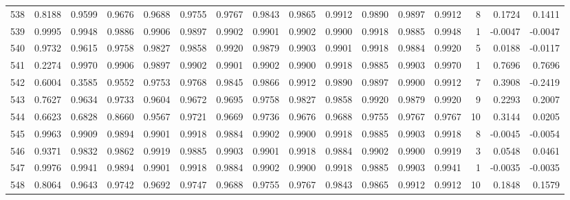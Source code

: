 \begin{tabular}{lrrrrrrrrrrrrrrr}
538 &      0.8188 &  0.9599 &  0.9676 &  0.9688 &  0.9755 &  0.9767 &  0.9843 &  0.9865 &  0.9912 &  0.9890 &   0.9897 &     0.9912 &      8 &                    0.1724 &                     0.1411 \\
539 &      0.9995 &  0.9948 &  0.9886 &  0.9906 &  0.9897 &  0.9902 &  0.9901 &  0.9902 &  0.9900 &  0.9918 &   0.9885 &     0.9948 &      1 &                   -0.0047 &                    -0.0047 \\
540 &      0.9732 &  0.9615 &  0.9758 &  0.9827 &  0.9858 &  0.9920 &  0.9879 &  0.9903 &  0.9901 &  0.9918 &   0.9884 &     0.9920 &      5 &                    0.0188 &                    -0.0117 \\
541 &      0.2274 &  0.9970 &  0.9906 &  0.9897 &  0.9902 &  0.9901 &  0.9902 &  0.9900 &  0.9918 &  0.9885 &   0.9903 &     0.9970 &      1 &                    0.7696 &                     0.7696 \\
542 &      0.6004 &  0.3585 &  0.9552 &  0.9753 &  0.9768 &  0.9845 &  0.9866 &  0.9912 &  0.9890 &  0.9897 &   0.9900 &     0.9912 &      7 &                    0.3908 &                    -0.2419 \\
543 &      0.7627 &  0.9634 &  0.9733 &  0.9604 &  0.9672 &  0.9695 &  0.9758 &  0.9827 &  0.9858 &  0.9920 &   0.9879 &     0.9920 &      9 &                    0.2293 &                     0.2007 \\
544 &      0.6623 &  0.6828 &  0.8660 &  0.9567 &  0.9721 &  0.9669 &  0.9736 &  0.9676 &  0.9688 &  0.9755 &   0.9767 &     0.9767 &     10 &                    0.3144 &                     0.0205 \\
545 &      0.9963 &  0.9909 &  0.9894 &  0.9901 &  0.9918 &  0.9884 &  0.9902 &  0.9900 &  0.9918 &  0.9885 &   0.9903 &     0.9918 &      8 &                   -0.0045 &                    -0.0054 \\
546 &      0.9371 &  0.9832 &  0.9862 &  0.9919 &  0.9885 &  0.9903 &  0.9901 &  0.9918 &  0.9884 &  0.9902 &   0.9900 &     0.9919 &      3 &                    0.0548 &                     0.0461 \\
547 &      0.9976 &  0.9941 &  0.9894 &  0.9901 &  0.9918 &  0.9884 &  0.9902 &  0.9900 &  0.9918 &  0.9885 &   0.9903 &     0.9941 &      1 &                   -0.0035 &                    -0.0035 \\
548 &      0.8064 &  0.9643 &  0.9742 &  0.9692 &  0.9747 &  0.9688 &  0.9755 &  0.9767 &  0.9843 &  0.9865 &   0.9912 &     0.9912 &     10 &                    0.1848 &                     0.1579 \\

\end{tabular}
